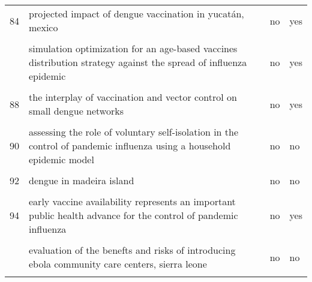 \documentclass[
]{article}
\begin{document}
\begin{landscape}
\begin{longtable}{l>{\raggedright\arraybackslash}p{4cm}l>{\raggedright\arraybackslash}p{4cm}}
84 & projected impact of dengue vaccination in yucatán, mexico & no & yes\\
\cellcolor{gray!6}{85} & \cellcolor{gray!6}{seasonality and the effectiveness of mass vaccination} & \cellcolor{gray!6}{no} & \cellcolor{gray!6}{yes}\\
\addlinespace
86 & simulation optimization for an age-based vaccines distribution strategy against the spread of influenza epidemic & no & yes\\
\cellcolor{gray!6}{87} & \cellcolor{gray!6}{spatiotemporal dynamics of the ebola epidemic in guinea and implications for vaccination and disease elimination: a computational modeling analysis} & \cellcolor{gray!6}{no} & \cellcolor{gray!6}{yes}\\
88 & the interplay of vaccination and vector control on small dengue networks & no & yes\\
\cellcolor{gray!6}{89} & \cellcolor{gray!6}{an epidemic patchy model with entry–exit screening} & \cellcolor{gray!6}{no} & \cellcolor{gray!6}{no}\\
90 & assessing the role of voluntary self-isolation in the control of pandemic influenza using a household epidemic model & no & no\\
\addlinespace
\cellcolor{gray!6}{91} & \cellcolor{gray!6}{be-codis: a mathematical model to predict the risk of human diseases spread between countries—validation and application to the 2014–2015 ebola virus disease epidemic} & \cellcolor{gray!6}{yes} & \cellcolor{gray!6}{no}\\
92 & dengue in madeira island & no & no\\
\cellcolor{gray!6}{93} & \cellcolor{gray!6}{dynamic simulation of a seiqr-v epidemic model based on cellular automata} & \cellcolor{gray!6}{no} & \cellcolor{gray!6}{yes}\\
94 & early vaccine availability represents an important public health advance for the control of pandemic influenza & no & yes\\
\cellcolor{gray!6}{95} & \cellcolor{gray!6}{effectiveness of ebola treatment units and community care centers — liberia, september 23–october 31, 2014} & \cellcolor{gray!6}{no} & \cellcolor{gray!6}{no}\\
\addlinespace
96 & evaluation of the benefts and risks of introducing ebola community care centers, sierra leone & no & no\\
\cellcolor{gray!6}{97} & \cellcolor{gray!6}{evidence for emergency vaccination having played a crucial role to control the 1965/66 foot-and-mouth disease outbreak in switzerland} & \cellcolor{gray!6}{no} & \cellcolor{gray!6}{yes}\\

\end{longtable}
\end{landscape}
\end{document}
